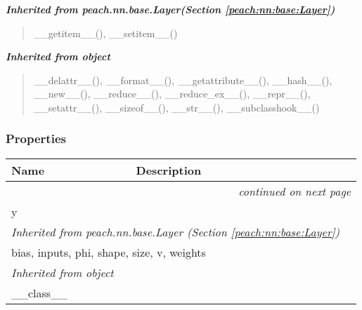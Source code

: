 \large{\textbf{\textit{Inherited from peach.nn.base.Layer\textit{(Section \ref{peach:nn:base:Layer})}}}}

\begin{quote}
\_\_getitem\_\_(), \_\_setitem\_\_()
\end{quote}

\large{\textbf{\textit{Inherited from object}}}

\begin{quote}
\_\_delattr\_\_(), \_\_format\_\_(), \_\_getattribute\_\_(), \_\_hash\_\_(), \_\_new\_\_(), \_\_reduce\_\_(), \_\_reduce\_ex\_\_(), \_\_repr\_\_(), \_\_setattr\_\_(), \_\_sizeof\_\_(), \_\_str\_\_(), \_\_subclasshook\_\_()
\end{quote}


  \subsubsection{Properties}

    \vspace{-1cm}
\hspace{\varindent}\begin{longtable}{|p{\varnamewidth}|p{\vardescrwidth}|l}
\cline{1-2}
\cline{1-2} \centering \textbf{Name} & \centering \textbf{Description}& \\
\cline{1-2}
\endhead\cline{1-2}\multicolumn{3}{r}{\small\textit{continued on next page}}\\\endfoot\cline{1-2}
\endlastfoot\raggedright y\- & &\\
\cline{1-2}
\multicolumn{2}{|l|}{\textit{Inherited from peach.nn.base.Layer \textit{(Section \ref{peach:nn:base:Layer})}}}\\
\multicolumn{2}{|p{\varwidth}|}{\raggedright bias, inputs, phi, shape, size, v, weights}\\
\cline{1-2}
\multicolumn{2}{|l|}{\textit{Inherited from object}}\\
\multicolumn{2}{|p{\varwidth}|}{\raggedright \_\_class\_\_}\\
\cline{1-2}
\end{longtable}

